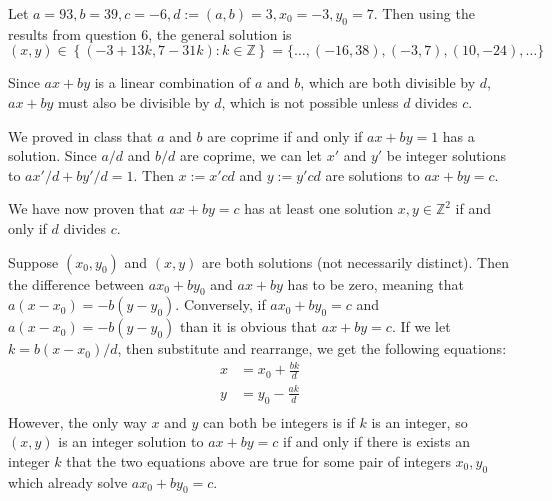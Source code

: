 \documentclass[12pt]{article}
\begin{document}
\bigskip
\noindent{}\bigskip

Let $a=93, b=39, c=-6, d := (a,b) = 3, x_0 = -3, y_0=7$. Then using the results from question 6, the general solution is
\[ (x, y) \in \left\{ \left( -3 + 13k, 7 - 31k \right): k \in \mathbb{Z} \right\} = \{ \dots, (-16, 38), (-3, 7), (10, -24), \dots \} \]

\bigskip
\noindent{}\bigskip

Since $ax+by$ is a linear combination of $a$ and $b$, which are both divisible by $d$, $ax+by$ must also be divisible by $d$, which is not possible unless $d$ divides $c$.
\par
We proved in class that $a$ and $b$ are coprime if and only if $ax + by = 1$ has a solution. Since $a/d$ and $b/d$ are coprime, we can let $x'$ and $y'$ be integer solutions to $ax'/d+by'/d=1$. Then $x:=x'cd$ and $y:=y'cd$ are solutions to $ax+by=c$.
\par
We have now proven that $ax+by=c$ has at least one solution $x,y \in \mathbb{Z}^2$ if and only if $d$ divides $c$.
\par
Suppose $(x_0, y_0)$ and $(x, y)$ are both solutions (not necessarily distinct). Then the difference between $ax_0+by_0$ and $ax+by$ has to be zero, meaning that $a(x-x_0)=-b(y-y_0)$. Conversely, if $ax_0+by_0=c$ and $a(x-x_0)=-b(y-y_0)$ than it is obvious that $ax+by=c$. If we let $k=b(x-x_0)/d$, then substitute and rearrange, we get the following equations:
\begin{align*}
    x &= x_0 + \frac{bk}{d} \\
    y &= y_0- \frac{ak}{d} \\
\end{align*}
However, the only way $x$ and $y$ can both be integers is if $k$ is an integer, so $(x, y)$ is an integer solution to $ax + by = c$ if and only if there is exists an integer $k$ that the two equations above are true for some pair of integers $x_0, y_0$ which already solve $ax_0+by_0=c$.

\bigskip
\noindent{}\bigskip
\end{document}
